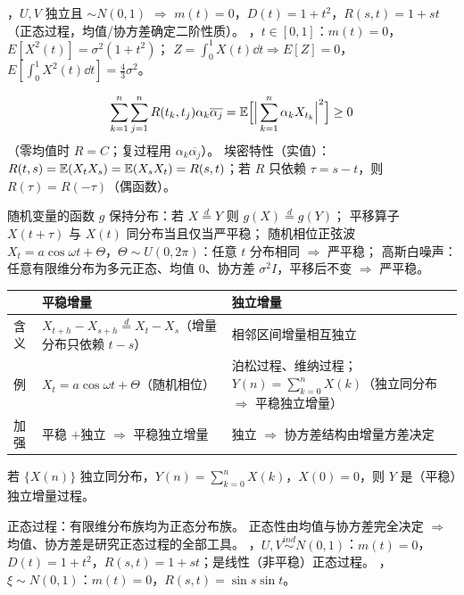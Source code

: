 \documentclass[UTF8,12pt,a4paper]{ctexart}
\begin{document}
，$U,V$ 独立且 $\sim N(0,1)$ $\Rightarrow$ $m(t)=0$，$D(t)=1+t^2$，$R(s,t)=1+st$（正态过程，均值/协方差确定二阶性质）。
，$t\in[0,1]$：$m(t)=0$，$E[X^2(t)]=\sigma^2(1+t^2)$；
$Z=\int_0^1X(t)\dd t\Rightarrow E[Z]=0$，$E\!\left[\int_0^1X^2(t)\dd t\right]=\frac{4}{3}\sigma^2$。

$$\sum_{k=1}^n\sum_{j=1}^nR(t_k,t_j)\alpha_k\overline{\alpha_j}=\mathbb{E}\Big[\Big|\sum_{k=1}^n\alpha_kX_{t_k}\Big|^2\Big]\ge0$$
（零均值时 $R=C$；复过程用 $\alpha_k\overline{\alpha_j}$）。
埃密特性（实值）：$R(t,s)=\mathbb{E}(X_tX_s)=\mathbb{E}(X_sX_t)=R(s,t)$；若 $R$ 只依赖 $\tau=s-t$，则 $R(\tau)=R(-\tau)$（偶函数）。

随机变量的函数 $g$ 保持分布：若 $X\stackrel{d}{=}Y$ 则 $g(X)\stackrel{d}{=}g(Y)$；
平移算子 $X(t+\tau)$ 与 $X(t)$ 同分布当且仅当严平稳；
随机相位正弦波 $X_t=a\cos\omega t+\Theta$，$\Theta\sim U(0,2\pi)$：任意 $t$ 分布相同 $\Rightarrow$ 严平稳；
高斯白噪声：任意有限维分布为多元正态、均值 0、协方差 $\sigma^2I$，平移后不变 $\Rightarrow$ 严平稳。


\begin{center}\footnotesize
\begin{tabular}{p{1.75cm}p{3.15cm}p{3.73cm}}\hline
 & 平稳增量 & 独立增量\\\hline
含义 & $X_{t+h}-X_{s+h}\overset{d}=X_t-X_s$（增量分布只依赖 $t-s$） & 相邻区间增量相互独立\\
例 & $X_t=a\cos\omega t+\Theta$（随机相位） & 泊松过程、维纳过程；$Y(n)=\sum_{k=0}^nX(k)$（独立同分布 $\Rightarrow$ 平稳独立增量）\\
加强 & 平稳 $+$独立 $\Rightarrow$ 平稳独立增量 & 独立 $\Rightarrow$ 协方差结构由增量方差决定\\\hline
\end{tabular}\end{center}

 若 $\{X(n)\}$ 独立同分布，$Y(n)=\sum_{k=0}^nX(k)$，$X(0)=0$，则 $Y$ 是（平稳）独立增量过程。

正态过程：有限维分布族均为正态分布族。
正态性由均值与协方差完全决定 $\Rightarrow$ 均值、协方差是研究正态过程的全部工具。
，$U,V\overset{ind}{\sim}N(0,1)$：$m(t)=0$，$D(t)=1+t^2$，$R(s,t)=1+st$；是线性（非平稳）正态过程。
，$\xi\sim N(0,1)$：$m(t)=0$，$R(s,t)=\sin s\sin t$。
\end{document}
